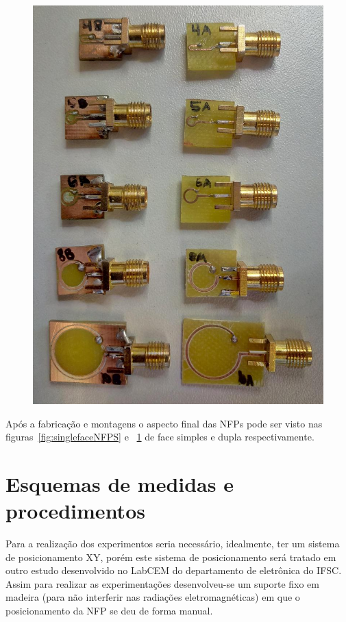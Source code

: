 \begin{figure}[htb!]
{		\includegraphics[scale=0.37]{./img/doublefaceNFPS}
		\label{fig:doublefaceNFPS}}
\end{figure}

Após a fabricação e montagens o aspecto final das NFPs pode ser visto nas figuras~\ref{fig:singlefaceNFPS} e ~\ref{fig:doublefaceNFPS} de face simples e dupla respectivamente.

\section{Esquemas de medidas e procedimentos}
Para a realização dos experimentos seria necessário, idealmente, ter um sistema de posicionamento XY, porém este sistema de posicionamento será tratado em outro estudo desenvolvido no LabCEM do departamento de eletrônica do IFSC. Assim para realizar as experimentações desenvolveu-se um suporte fixo em madeira (para não interferir nas radiações eletromagnéticas) em que o posicionamento da NFP se deu de forma manual.

